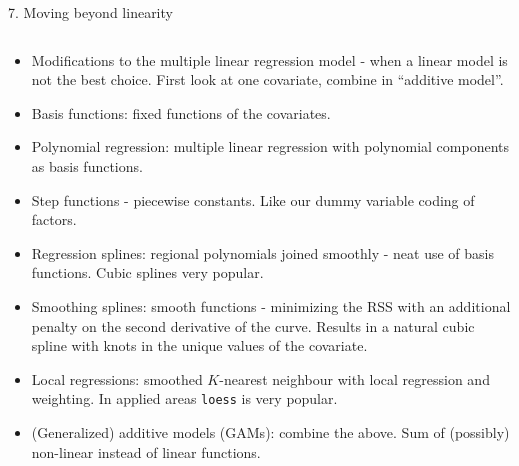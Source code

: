\documentclass[10pt,ignorenonframetext,]{beamer}
\begin{document}
\begin{frame}

\begin{block}{7. Moving beyond linearity}

\(~\)

\begin{itemize}
\item
  Modifications to the multiple linear regression model - when a linear
  model is not the best choice. First look at one covariate, combine in
  ``additive model''. \vspace{2mm}
\item
  Basis functions: fixed functions of the covariates. \vspace{2mm}
\item
  Polynomial regression: multiple linear regression with polynomial
  components as basis functions. \vspace{2mm}
\item
  Step functions - piecewise constants. Like our dummy variable coding
  of factors. \vspace{2mm}
\item
  Regression splines: regional polynomials joined smoothly - neat use of
  basis functions. Cubic splines very popular.
\end{itemize}

\end{block}

\end{frame}

\begin{frame}[fragile]

\begin{itemize}
\item
  Smoothing splines: smooth functions - minimizing the RSS with an
  additional penalty on the second derivative of the curve. Results in a
  natural cubic spline with knots in the unique values of the covariate.
  \vspace{2mm}
\item
  Local regressions: smoothed \(K\)-nearest neighbour with local
  regression and weighting. In applied areas \texttt{loess} is very
  popular. \vspace{2mm}
\item
  (Generalized) additive models (GAMs): combine the above. Sum of
  (possibly) non-linear instead of linear functions.
\end{itemize}

\end{frame}
\end{document}

